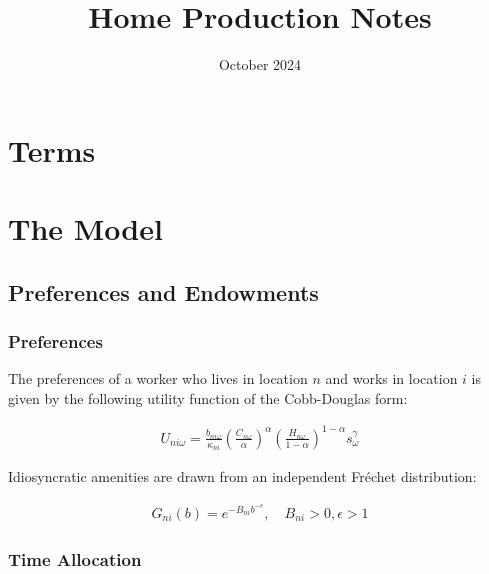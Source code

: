 \documentclass[10pt]{article}
\title{Home Production Notes}
\author{}
\date{October 2024}
\begin{document}
\maketitle

\tableofcontents

\section{Terms}




\section{The Model}

\subsection{Preferences and Endowments}

\subsubsection{Preferences}

The preferences of a worker who lives in location $n$ and works in location $i$ is given by the following utility function of the Cobb-Douglas form:

\begin{align}
    U_{n i \omega}=\frac{b_{n i \omega}}{\kappa_{n i}}\left(\frac{C_{n \omega}}{\alpha}\right)^\alpha\left(\frac{H_{n \omega}}{1-\alpha}\right)^{1-\alpha} s_\omega^\gamma \label{eq:utility_1}
\end{align}

Idiosyncratic amenities 
are drawn from 
an independent Fréchet distribution:

\begin{align}
    G_{n i}(b)=e^{-B_{n i} b^{-\epsilon}}, \quad B_{n i}>0, \epsilon>1
\end{align}

\subsubsection{Time Allocation}
\end{document}
